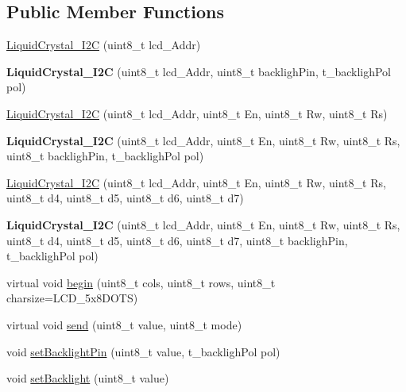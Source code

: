 \subsection*{Public Member Functions}
\begin{DoxyCompactItemize}
\item 
\hyperlink{class_liquid_crystal___i2_c_aac537d195557e0b8afac1a71441a484c}{Liquid\+Crystal\+\_\+\+I2\+C} (uint8\+\_\+t lcd\+\_\+\+Addr)
\item 
\hypertarget{class_liquid_crystal___i2_c_a9fc9bc519ebbf7503dadc11622e02ed6}{}{\bfseries Liquid\+Crystal\+\_\+\+I2\+C} (uint8\+\_\+t lcd\+\_\+\+Addr, uint8\+\_\+t backligh\+Pin, t\+\_\+backligh\+Pol pol)\label{class_liquid_crystal___i2_c_a9fc9bc519ebbf7503dadc11622e02ed6}

\item 
\hyperlink{class_liquid_crystal___i2_c_a517f8847ebf09f0eacfb9c7232975fce}{Liquid\+Crystal\+\_\+\+I2\+C} (uint8\+\_\+t lcd\+\_\+\+Addr, uint8\+\_\+t En, uint8\+\_\+t Rw, uint8\+\_\+t Rs)
\item 
\hypertarget{class_liquid_crystal___i2_c_add1f2da7de4ec9b9cd5c9b5fab712464}{}{\bfseries Liquid\+Crystal\+\_\+\+I2\+C} (uint8\+\_\+t lcd\+\_\+\+Addr, uint8\+\_\+t En, uint8\+\_\+t Rw, uint8\+\_\+t Rs, uint8\+\_\+t backligh\+Pin, t\+\_\+backligh\+Pol pol)\label{class_liquid_crystal___i2_c_add1f2da7de4ec9b9cd5c9b5fab712464}

\item 
\hyperlink{class_liquid_crystal___i2_c_a7d9b54d3a91fa0e0e50db27cda6b4654}{Liquid\+Crystal\+\_\+\+I2\+C} (uint8\+\_\+t lcd\+\_\+\+Addr, uint8\+\_\+t En, uint8\+\_\+t Rw, uint8\+\_\+t Rs, uint8\+\_\+t d4, uint8\+\_\+t d5, uint8\+\_\+t d6, uint8\+\_\+t d7)
\item 
\hypertarget{class_liquid_crystal___i2_c_ab15622287533de7a47f3e2012ebf18be}{}{\bfseries Liquid\+Crystal\+\_\+\+I2\+C} (uint8\+\_\+t lcd\+\_\+\+Addr, uint8\+\_\+t En, uint8\+\_\+t Rw, uint8\+\_\+t Rs, uint8\+\_\+t d4, uint8\+\_\+t d5, uint8\+\_\+t d6, uint8\+\_\+t d7, uint8\+\_\+t backligh\+Pin, t\+\_\+backligh\+Pol pol)\label{class_liquid_crystal___i2_c_ab15622287533de7a47f3e2012ebf18be}

\item 
virtual void \hyperlink{class_liquid_crystal___i2_c_aeee2ada537f0cfbfda8613324b57c4a6}{begin} (uint8\+\_\+t cols, uint8\+\_\+t rows, uint8\+\_\+t charsize=L\+C\+D\+\_\+5x8\+D\+O\+T\+S)
\item 
virtual void \hyperlink{class_liquid_crystal___i2_c_a8bf1fab7efe13e8b17b96c42d1f810b4}{send} (uint8\+\_\+t value, uint8\+\_\+t mode)
\item 
void \hyperlink{class_liquid_crystal___i2_c_a2eaf86f62d1f169b3763b03fbf88f70b}{set\+Backlight\+Pin} (uint8\+\_\+t value, t\+\_\+backligh\+Pol pol)
\item 
void \hyperlink{class_liquid_crystal___i2_c_af11b8fa0082616e2b6e6e4238589d8a8}{set\+Backlight} (uint8\+\_\+t value)
\end{DoxyCompactItemize}
